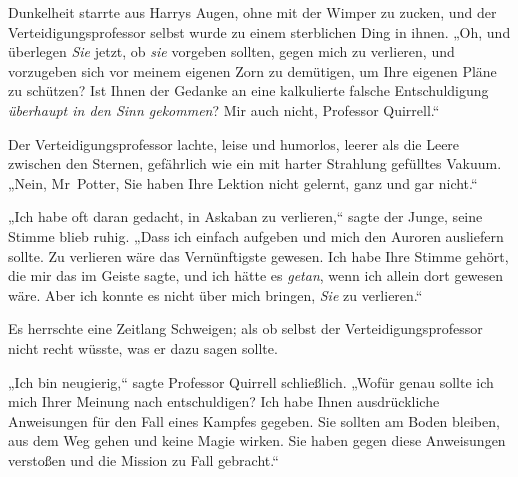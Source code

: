 Dunkelheit starrte aus Harrys Augen, ohne mit der Wimper zu zucken, und der Verteidigungsprofessor selbst wurde zu einem sterblichen Ding in ihnen. „Oh, und überlegen \emph{Sie} jetzt, ob \emph{sie} vorgeben sollten, gegen mich zu verlieren, und vorzugeben sich vor meinem eigenen Zorn zu demütigen, um Ihre eigenen Pläne zu schützen? Ist Ihnen der Gedanke an eine kalkulierte falsche Entschuldigung \emph{überhaupt in den Sinn gekommen}? Mir auch nicht, Professor Quirrell.“

Der Verteidigungsprofessor lachte, leise und humorlos, leerer als die Leere zwischen den Sternen, gefährlich wie ein mit harter Strahlung gefülltes Vakuum. „Nein, Mr~Potter, Sie haben Ihre Lektion nicht gelernt, ganz und gar nicht.“

„Ich habe oft daran gedacht, in Askaban zu verlieren,“ sagte der Junge, seine Stimme blieb ruhig. „Dass ich einfach aufgeben und mich den Auroren ausliefern sollte. Zu verlieren wäre das Vernünftigste gewesen. Ich habe Ihre Stimme gehört, die mir das im Geiste sagte, und ich hätte es \emph{getan}, wenn ich allein dort gewesen wäre. Aber ich konnte es nicht über mich bringen, \emph{Sie} zu verlieren.“

Es herrschte eine Zeitlang Schweigen; als ob selbst der Verteidigungsprofessor nicht recht wüsste, was er dazu sagen sollte.

„Ich bin neugierig,“ sagte Professor Quirrell schließlich. „Wofür genau sollte ich mich Ihrer Meinung nach entschuldigen? Ich habe Ihnen ausdrückliche Anweisungen für den Fall eines Kampfes gegeben. Sie sollten am Boden bleiben, aus dem Weg gehen und keine Magie wirken. Sie haben gegen diese Anweisungen verstoßen und die Mission zu Fall gebracht.“

